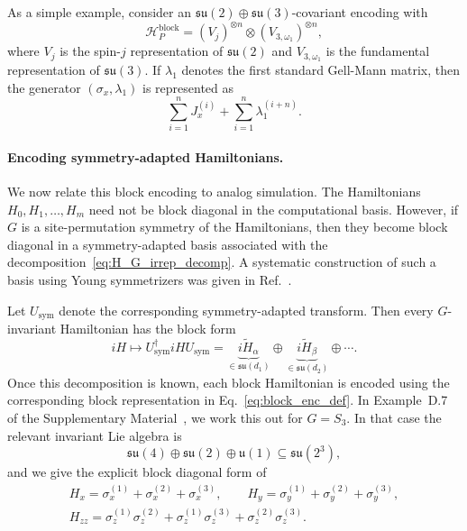 \documentclass[10pt,twocolumn,superscriptaddress,aps,amsmath,amssymb,citeautoscript,floatfix,prx]{revtex4-2}
\newcounter{alg}
\theoremstyle{plain}
\theoremstyle{plain}
\theoremstyle{plain}
\theoremstyle{plain}
\theoremstyle{plain}
\theoremstyle{plain}
\begin{document}
As a simple example, consider an $\mathfrak{su}(2)\oplus\mathfrak{su}(3)$-covariant encoding with
$$
\mathcal H_P^{\mathrm{block}}
=
(V_j)^{\otimes n}
\otimes
(V_{3,\omega_1})^{\otimes n},
$$
where $V_j$ is the spin-$j$ representation of $\mathfrak{su}(2)$ and $V_{3,\omega_1}$ is the fundamental representation of $\mathfrak{su}(3)$. If $\lambda_1$ denotes the first standard Gell-Mann matrix, then the generator $(\sigma_x,\lambda_1)$ is represented as
$$
\sum_{i=1}^n J_x^{(i)}
+
\sum_{i=1}^n \lambda_1^{(i+n)} .
$$

\paragraph{Encoding symmetry-adapted Hamiltonians.}

We now relate this block encoding to analog simulation. The Hamiltonians ${H_0,H_1,\ldots,H_m}$ need not be block diagonal in the computational basis. However, if $G$ is a site-permutation symmetry of the Hamiltonians, then they become block diagonal in a symmetry-adapted basis associated with the decomposition~\eqref{eq:H_G_irrep_decomp}. A systematic construction of such a basis using Young symmetrizers was given in Ref.~\cite{DAlessandroHartwig2021}.

Let $U_{\mathrm{sym}}$ denote the corresponding symmetry-adapted transform. Then every $G$-invariant Hamiltonian has the block form
$$
iH
\longmapsto
U_{\mathrm{sym}}^\dagger iH U_{\mathrm{sym}}
=
\underbrace{i\widetilde H_{\alpha}}_{\in\mathfrak{su}(d_1)}
\oplus
\underbrace{i\widetilde H_{\beta}}_{\in\mathfrak{su}(d_2)}
\oplus
\cdots .
$$
Once this decomposition is known, each block Hamiltonian is encoded using the corresponding block representation in Eq.~\eqref{eq:block_enc_def}. In Example~D.7 of the Supplementary Material~\cite{SuppMat}, we work this out for $G=S_3$. In that case the relevant invariant Lie algebra is
$$
\mathfrak{su}(4)
\oplus
\mathfrak{su}(2)
\oplus
\mathfrak{u}(1)\subseteq \mathfrak{su}(2^3),
$$
and we give the explicit block diagonal form of
\begin{equation}\label{eq:s3_ex_hams}
\begin{gathered}
H_x
=
\sigma_x^{(1)}
+
\sigma_x^{(2)}
+
\sigma_x^{(3)},
\qquad
H_y
=
\sigma_y^{(1)}
+
\sigma_y^{(2)}
+
\sigma_y^{(3)},
\\
H_{zz}
=
\sigma_z^{(1)}\sigma_z^{(2)}
+
\sigma_z^{(1)}\sigma_z^{(3)}
+
\sigma_z^{(2)}\sigma_z^{(3)} .
\end{gathered}
\end{equation}
\end{document}
